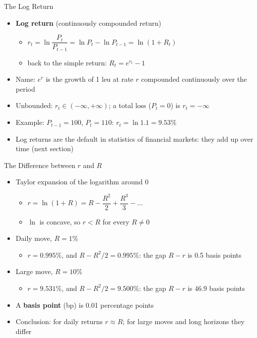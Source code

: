\begin{frame}{The Log Return}
\itemsize{\small}
\begin{itemize}
    \item \textbf{Log return} (continuously compounded return)
    \begin{itemize}
        \item $r_t = \ln\dfrac{P_t}{P_{t-1}} = \ln P_t - \ln P_{t-1} = \ln(1 + R_t)$
        \item back to the simple return: $R_t = e^{r_t} - 1$
    \end{itemize}
    \item Name: $e^{r}$ is the growth of 1 leu at rate $r$ compounded continuously over the period
    \item Unbounded: $r_t \in (-\infty, +\infty)$; a total loss ($P_t = 0$) is $r_t = -\infty$
    \item Example: $P_{t-1} = 100$, $P_t = 110$: $r_t = \ln 1.1 = 9.53\%$
    \item Log returns are the default in statistics of financial markets: they add up over time (next section)
\end{itemize}
\end{frame}

\begin{frame}{The Difference between $r$ and $R$}
\itemsize{\small}
\begin{itemize}
    \item Taylor expansion of the logarithm around 0
    \begin{itemize}
        \item $r = \ln(1 + R) = R - \dfrac{R^2}{2} + \dfrac{R^3}{3} - \dots$
        \item $\ln$ is concave, so $r < R$ for every $R \neq 0$
    \end{itemize}
    \item Daily move, $R = 1\%$
    \begin{itemize}
        \item $r = 0.995\%$, and $R - R^2/2 = 0.995\%$: the gap $R - r$ is 0.5 basis points
    \end{itemize}
    \item Large move, $R = 10\%$
    \begin{itemize}
        \item $r = 9.531\%$, and $R - R^2/2 = 9.500\%$: the gap $R - r$ is 46.9 basis points
    \end{itemize}
    \item A \textbf{basis point} (bp) is 0.01 percentage points
    \item Conclusion: for daily returns $r \approx R$; for large moves and long horizons they differ
\end{itemize}
\end{frame}


